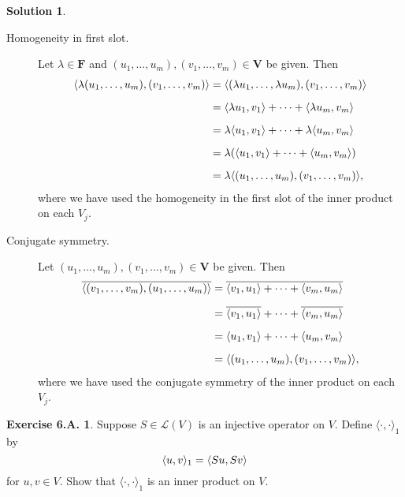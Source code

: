 \documentclass[12pt]{article}
\theoremstyle{definition}
\theoremstyle{exercise}
\newtheorem{exercise}{Exercise 6.A.}
\theoremstyle{solution}
\newtheorem*{solution}{Solution}
\newcommand{\lmap}{\mathcal{L}}
\newcommand{\ipanon}{\langle \cdot, \cdot \rangle}
\newcommand{\F}{\mathbf{F}}
\DeclarePairedDelimiter\ip{\langle}{\rangle}
\begin{document}
\begin{solution}
\begin{description}
        \item[Homogeneity in first slot.] Let \( \lambda \in \F \) and \( (u_1, \ldots, u_m), (v_1, \ldots, v_m) \in \mathbf{V} \) be given. Then
        \begin{align*}
            \ip{\lambda (u_1, \ldots, u_m), (v_1, \ldots, v_m)} &= \ip{(\lambda u_1, \ldots, \lambda u_m), (v_1, \ldots, v_m)} \\[2mm]
            &= \ip{\lambda u_1, v_1} + \cdots + \ip{\lambda u_m, v_m} \\[2mm]
            &= \lambda \ip{u_1, v_1} + \cdots + \lambda \ip{u_m, v_m} \\[2mm]
            &= \lambda (\ip{u_1, v_1} + \cdots + \ip{u_m, v_m}) \\[2mm]
            &= \lambda \ip{(u_1, \ldots, u_m), (v_1, \ldots, v_m)},
        \end{align*}
        where we have used the homogeneity in the first slot of the inner product on each \( V_j \).

        \item[Conjugate symmetry.] Let \( (u_1, \ldots, u_m), (v_1, \ldots, v_m) \in \mathbf{V} \) be given. Then
        \begin{align*}
            \overline{\ip{(v_1, \ldots, v_m), (u_1, \ldots, u_m)}} &= \overline{\ip{v_1, u_1} + \cdots + \ip{v_m, u_m}} \\[2mm]
            &= \overline{\ip{v_1, u_1}} + \cdots + \overline{\ip{v_m, u_m}} \\[2mm]
            &= \ip{u_1, v_1} + \cdots + \ip{u_m, v_m} \\[2mm]
            &= \ip{(u_1, \ldots, u_m), (v_1, \ldots, v_m)},
        \end{align*}
        where we have used the conjugate symmetry of the inner product on each \( V_j \).
    \end{description}
\end{solution}

\begin{exercise}
\label{ex:24}
    Suppose \( S \in \lmap(V) \) is an injective operator on \( V \). Define \( \ipanon_1 \) by
    \[
        \ip{u, v}_1 = \ip{Su, Sv}
    \]
    for \( u, v \in V \). Show that \( \ipanon_1 \) is an inner product on \( V \).
\end{exercise}
\end{document}
